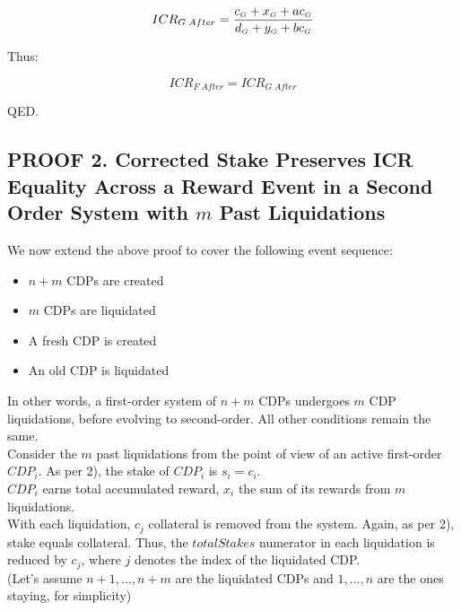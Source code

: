 \documentclass[reqno]{article}
\begin{document}
\begin{equation} 
    ICR_{G \; After}=\frac{c_\mathsmaller{G}+x_\mathsmaller{G}+ac_\mathsmaller{G}}{d_\mathsmaller{G}+y_\mathsmaller{G}+bc_\mathsmaller{G}}
\end{equation}

\bigskip
Thus:

\begin{equation} 
    ICR_{F \; After}=ICR_{G \; After}
\end{equation}

\bigskip
QED.

\subsection*{PROOF 2. Corrected Stake Preserves ICR Equality Across a Reward Event in a Second Order System with $m$ Past Liquidations}

We now extend the above proof to cover the following event sequence:

\begin{itemize}
  \item $n+m$ CDPs are created
  \item $m$ CDPs are liquidated
  \item A fresh CDP is created
  \item An old CDP is liquidated
\end{itemize}

\bigskip
In other words, a first-order system of $n+m$ CDPs undergoes $m$ CDP liquidations, before evolving to second-order.  All other conditions remain the same.\\

Consider the $m$ past liquidations from the point of view of an active first-order $CDP_i$. As per 2), the stake of $CDP_i$ is $s_i = c_i$.\\

$CDP_i$ earns total accumulated reward, $x_i$  the sum of its rewards from $m$ liquidations.\\

With each liquidation, $c_j$ collateral is removed from the system. Again, as per 2), stake equals collateral. Thus, the $totalStakes$ numerator in each liquidation is reduced by $c_j$, where $j$ denotes the index of the liquidated CDP.\\ 

(Let’s assume $n+1, ..., n+m$ are the liquidated CDPs and $1, ..., n$ are the ones staying, for simplicity)\\
\end{document}
